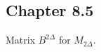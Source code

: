 \subsection{Chapter 8.5}

\begin{proposition}[8.5.3] %
  \label{prop:8.5.3}
  Matrix $B^{2 \Delta}$ for $M_{2 \Delta}$.
\end{proposition}

